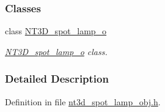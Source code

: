 \subsubsection*{Classes}
\begin{DoxyCompactItemize}
\item 
class \hyperlink{class_n_t3_d__spot__lamp__o}{NT3D\_\-spot\_\-lamp\_\-o}
\begin{DoxyCompactList}\small\item\em \hyperlink{class_n_t3_d__spot__lamp__o}{NT3D\_\-spot\_\-lamp\_\-o} class. \item\end{DoxyCompactList}\end{DoxyCompactItemize}


\subsubsection{Detailed Description}


Definition in file \hyperlink{nt3d__spot__lamp__obj_8h_source}{nt3d\_\-spot\_\-lamp\_\-obj.h}.

